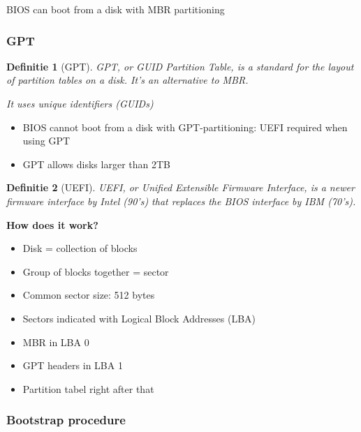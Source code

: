 \documentclass{article}
\newtheorem{theorem}{Definitie}[section]
\begin{document}
BIOS can boot from a disk with MBR partitioning

\subsubsection{GPT}

\begin{theorem}[GPT]
GPT, or GUID Partition Table, is a standard for the layout of partition tables on a disk.
It's an alternative to MBR.

It uses unique identifiers (GUIDs) 
\end{theorem}

\begin{itemize}
    \item BIOS cannot boot from a disk with GPT-partitioning: UEFI required when using GPT
    \item GPT allows disks larger than 2TB
\end{itemize}

\begin{theorem}[UEFI]
UEFI, or Unified Extensible Firmware Interface, is a newer firmware interface by Intel (90's) that replaces the BIOS interface by IBM (70's).
\end{theorem}

\textbf{How does it work?}

\begin{itemize}
    \item Disk = collection of blocks
    \item Group of blocks together = sector
    \item Common sector size: 512 bytes
    \item Sectors indicated with Logical Block Addresses (LBA)
    \item MBR in LBA 0
    \item GPT headers in LBA 1
    \item Partition tabel right after that
\end{itemize}




\subsubsection{Bootstrap procedure}
\end{document}
